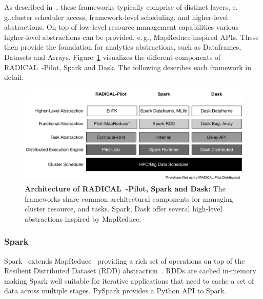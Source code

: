 As described in~\cite{jha2014tale}, these frameworks typically comprise of distinct layers, e.\,g.,cluster scheduler access, framework-level scheduling, and higher-level abstractions.
On top of low-level resource management capabilities various higher-level abstractions can be provided, e.\,g., MapReduce-inspired APIs.
These then provide the foundation for analytics abstractions, such as Dataframes, Datasets and Arrays.
Figure~\ref{fig:figures_bigdata_framework_stack} visualizes the different components of RADICAL~-Pilot, Spark and Dask.
The following describes each framework in detail.

\begin{figure}[ht]
    \centering
    \includegraphics[width=.95\textwidth]{figures/data_analytics_hpc/task_par/bigdata_framework_stack.pdf}
    \caption{\textbf{Architecture of RADICAL~-Pilot, Spark and Dask:}
    The frameworks share common architectural components for managing cluster resource, and tasks.
    Spark, Dask offer several high-level abstractions inspired by MapReduce.}
    \label{fig:figures_bigdata_framework_stack}
\end{figure}

\subsubsection*{Spark}
Spark~\cite{zaharia2010spark} extends MapReduce~\cite{dean2004mapreduce} providing a rich set of operations on top of the Resilient Distributed Dataset (RDD) abstraction~\cite{zaharia2012resilient}.
RDDs are cached in-memory making Spark well suitable for iterative applications that need to cache a set of data across multiple stages.
PySpark provides a Python API to Spark.

